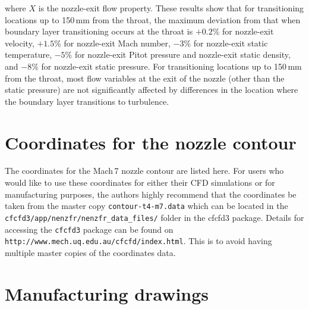 \documentclass[12pt,a4paper]{article}
\begin{document}
%
where $X$ is the nozzle-exit flow property. These results show that for transitioning
locations up to 150\,mm from the throat, the maximum deviation from that when 
boundary layer transitioning occurs at the throat is $+0.2$\% for nozzle-exit 
velocity, $+1.5$\% for nozzle-exit Mach number, $-3$\% for nozzle-exit static 
temperature, $-5$\% for nozzle-exit Pitot pressure and nozzle-exit static density, 
and $-8$\% for nozzle-exit static pressure. For transitioning locations up to 150\,mm 
from the throat, most flow variables at the exit of the nozzle (other than the static 
pressure) are not significantly affected by differences in the location where the 
boundary layer transitions to turbulence.

\newpage
\section{Coordinates for the nozzle contour}
\label{app:nozzle-coordinates}
%
The coordinates for the Mach\,7 nozzle contour are listed here. For users
who would like to use these coordinates for either their CFD simulations or for
manufacturing purposes, the authors highly recommend that the coordinates be 
taken from the master copy \texttt{contour-t4-m7.data} which can be located in the 
\texttt{cfcfd3/app/nenzfr/nenzfr\_data\_files/} folder in the cfcfd3 package. Details
for accessing the \texttt{cfcfd3} package can be found on 
\texttt{http://www.mech.uq.edu.au/cfcfd/index.html}. This is to avoid having
multiple master copies of the coordinates data.
%
\vspace{5mm}


\newpage
\section{Manufacturing drawings}
\label{app:manufacturing-drawings}
\end{document}
